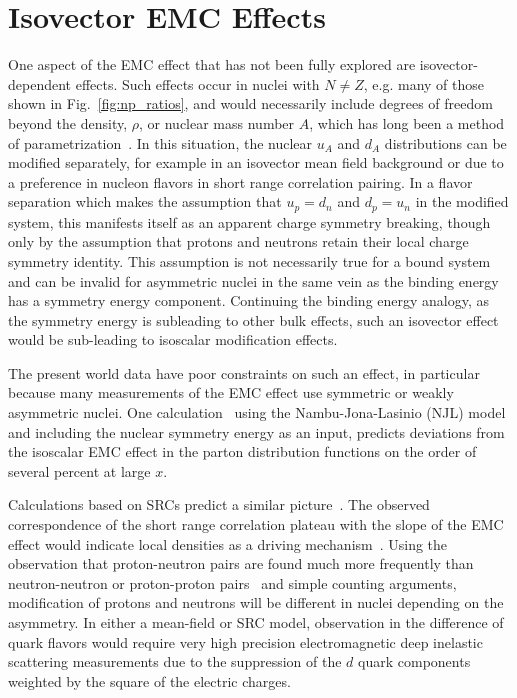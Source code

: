 \section{Isovector EMC Effects\label{sec:ivemc}}
%
One aspect of the EMC effect that has not been fully explored are isovector-dependent effects.  Such effects occur in nuclei with $N \neq Z$, e.g. many of those shown in Fig.~\ref{fig:np_ratios}, and would necessarily include degrees of freedom beyond the density, $\rho$, or nuclear mass number $A$, which has long been a method of parametrization~\cite{Malace:2014uea}.  In this situation, the nuclear $u_A$ and $d_A$ distributions can be modified separately, for example in an isovector mean field background or due to a preference in nucleon flavors in short range correlation pairing.  In a flavor separation which makes the assumption that $u_p = d_n$ and $d_p = u_n$ in the modified system, this manifests itself as an apparent charge symmetry breaking, though only by the assumption that protons and neutrons retain their local charge symmetry identity. This assumption is not necessarily true for a bound system and can be invalid for asymmetric nuclei in the same vein as the binding energy has a symmetry energy component.  Continuing the binding energy analogy, as the symmetry energy is subleading to other bulk effects, such an isovector effect would be sub-leading to isoscalar modification effects.

The present world data have poor constraints on such an effect, in particular because many measurements of the EMC effect use symmetric or weakly asymmetric nuclei. One calculation~\cite{Cloet:2009qs,Cloet:2012td} using the Nambu-Jona-Lasinio (NJL) model and including the nuclear symmetry energy as an input, predicts deviations from the isoscalar EMC effect in the parton distribution functions on the order of several percent at large $x$.

Calculations based on SRCs predict a similar picture~\cite{Sargsian:2012sm, Arrington:2015wja}.  The observed correspondence of the short range correlation plateau with the slope of the EMC effect would indicate local densities as a driving mechanism~\cite{Weinstein:2010rt}.  Using the observation that proton-neutron pairs are found much more frequently than neutron-neutron or proton-proton pairs~\cite{Subedi:2008zz} and simple counting arguments, modification of protons and neutrons will be different in nuclei depending on the asymmetry.  In either a mean-field or SRC model, observation in the difference of quark flavors would require very high precision electromagnetic deep inelastic scattering measurements due to the suppression of the $d$ quark components weighted by the square of the electric charges. 

